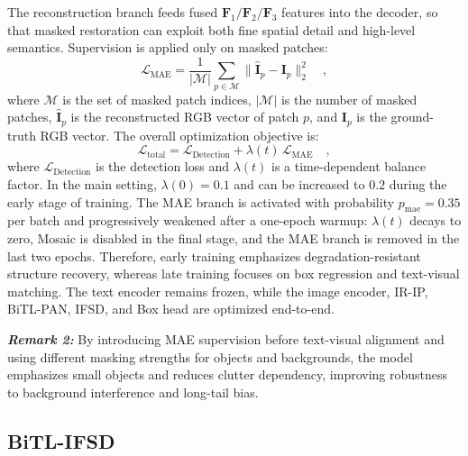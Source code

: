 \documentclass[letterpaper, 10 pt, conference]{ieeeconf}  %
\begin{document}
The reconstruction branch feeds fused $\mathbf{F}_1/\mathbf{F}_2/\mathbf{F}_3$ features into the decoder, so that masked restoration can exploit both fine spatial detail and high-level semantics. Supervision is applied only on masked patches:
\begin{equation}
\mathcal{L}_{\mathrm{MAE}} = \frac{1}{|\mathcal{M}|} \sum_{p \in \mathcal{M}} \| \hat{\mathbf{I}}_p - \mathbf{I}_p \|_2^2 \quad,
\end{equation}
where $\mathcal{M}$ is the set of masked patch indices, $|\mathcal{M}|$ is the number of masked patches, $\hat{\mathbf{I}}_p$ is the reconstructed RGB vector of patch $p$, and $\mathbf{I}_p$ is the ground-truth RGB vector. The overall optimization objective is:
\begin{equation}
\mathcal{L}_{\mathrm{total}} = \mathcal{L}_{\mathrm{Detection}} + \lambda(t)\,\mathcal{L}_{\mathrm{MAE}} \quad,
\end{equation}
where $\mathcal{L}_{\mathrm{Detection}}$ is the detection loss and $\lambda(t)$ is a time-dependent balance factor. In the main setting, $\lambda(0)=0.1$ and can be increased to $0.2$ during the early stage of training. The MAE branch is activated with probability $p_{\mathrm{mae}}=0.35$ per batch and progressively weakened after a one-epoch warmup: $\lambda(t)$ decays to zero, Mosaic is disabled in the final stage, and the MAE branch is removed in the last two epochs. Therefore, early training emphasizes degradation-resistant structure recovery, whereas late training focuses on box regression and text-visual matching. The text encoder remains frozen, while the image encoder, IR-IP, BiTL-PAN, IFSD, and Box head are optimized end-to-end.

\noindent\textbf{\textit{Remark 2:}} By introducing MAE supervision before text-visual alignment and using different masking strengths for objects and backgrounds, the model emphasizes small objects and reduces clutter dependency, improving robustness to background interference and long-tail bias.

\subsection{BiTL-IFSD}
\end{document}

